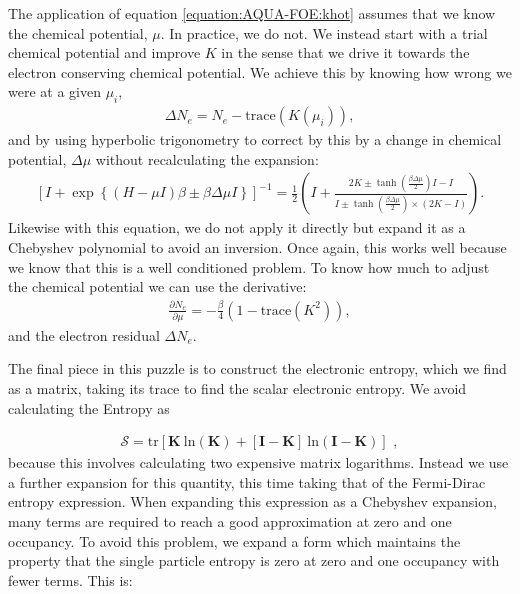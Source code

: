 \documentclass[letterpaper,10pt,english]{sphinxmanual}
\begin{document}
The application of equation \eqref{equation:AQUA-FOE:khot} assumes that we know the chemical
potential, \(\mu\). In practice, we do not. We instead start with a
trial chemical potential and improve \(K\) in the sense that we
drive it towards the electron conserving chemical potential. We achieve
this by knowing how wrong we were at a given \(\mu_i\),
\begin{equation*}
\begin{split}\Delta N_e=N_e - \mathrm{trace}\left(K(\mu_i)\right),\end{split}
\end{equation*}
and by using hyperbolic trigonometry to correct by this by a change in
chemical potential, \(\Delta\mu\) without recalculating the
expansion:
\begin{equation*}
\begin{split}\left[I+\exp\left \{ (H-\mu I)\beta\pm\beta\Delta\mu I\right \}\right ]^{-1}=\frac{1}{2}\left(I+\frac{2K\pm\tanh\left(\frac{\beta\Delta\mu}{2}\right)I -I}
{I\pm \tanh\left(\frac{\beta\Delta\mu}{2}\right)\times\left(2K-I\right)}\right).\end{split}
\end{equation*}
Likewise with this equation, we do not apply it directly but expand it
as a Chebyshev polynomial to avoid an inversion. Once again, this works
well because we know that this is a well conditioned problem. To know
how much to adjust the chemical potential we can use the derivative:
\begin{equation*}
\begin{split}\frac{\partial{N_e}}{\partial{\mu}}=-\frac{\beta}{4}\left(1-\mathrm{trace}(K^2)\right),\end{split}
\end{equation*}
and the electron residual \(\Delta N_e\).

The final piece in this puzzle is to construct the electronic entropy,
which we find as a matrix, taking its trace to find the scalar
electronic entropy. We avoid calculating the Entropy as

\label{\detokenize{AQUA-FOE:equation-entropymatrix}}\begin{equation}\label{equation:AQUA-FOE:entropymatrix}
\begin{split}\mathbf{\mathcal{S}}=
\mathrm{tr}[
\mathbf{K}\ \mathrm{ln}(\mathbf{K})+[\mathbf{I}-\mathbf{K}]\
\mathrm{ln}(\mathbf{I}-\mathbf{K})] \,\,,\end{split}
\end{equation}
because this involves calculating two expensive matrix logarithms.
Instead we use a further expansion for this quantity, this time taking
that of the Fermi-Dirac entropy expression. When expanding this
expression as a Chebyshev expansion, many terms are required to reach a
good approximation at zero and one occupancy. To avoid this problem, we
expand a form which maintains the property that the single particle
entropy is zero at zero and one occupancy with fewer terms. This is:
\end{document}
